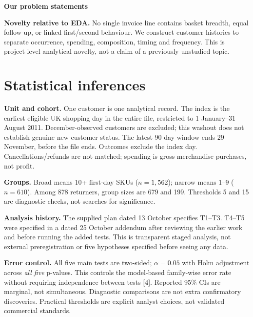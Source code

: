 \documentclass[10pt,a4paper,twocolumn]{article}
\newcommand{\minihead}[1]{\par\needspace{8\baselineskip}\smallskip\textbf{#1}\par}
\begin{document}
\minihead{Our problem statements}

\textbf{Novelty relative to EDA.} No single invoice line contains basket breadth, equal follow-up, or linked first/second behaviour. We construct customer histories to separate occurrence, spending, composition, timing and frequency. This is project-level analytical novelty, not a claim of a previously unstudied topic.

\section{Statistical inferences}
\textbf{Unit and cohort.} One customer is one analytical record. The index is the earliest eligible UK shopping day in the entire file, restricted to 1 January--31 August 2011. December-observed customers are excluded; this washout does not establish genuine new-customer status. The latest 90-day window ends 29 November, before the file ends. Outcomes exclude the index day. Cancellations/refunds are not matched; spending is gross merchandise purchases, not profit.

\textbf{Groups.} Broad means 10+ first-day SKUs ($n=1,562$); narrow means 1--9 ($n=610$). Among 878 returners, group sizes are 679 and 199. Thresholds 5 and 15 are diagnostic checks, not searches for significance.

\textbf{Analysis history.} The supplied plan dated 13 October specifies T1--T3. T4--T5 were specified in a dated 25 October addendum after reviewing the earlier work and before running the added tests. This is transparent staged analysis, not external preregistration or five hypotheses specified before seeing any data.

\textbf{Error control.} All five main tests are two-sided; $\alpha=0.05$ with Holm adjustment across \emph{all five} p-values. This controls the model-based family-wise error rate without requiring independence between tests [4]. Reported 95\% CIs are marginal, not simultaneous. Diagnostic comparisons are not extra confirmatory discoveries. Practical thresholds are explicit analyst choices, not validated commercial standards.
\end{document}
